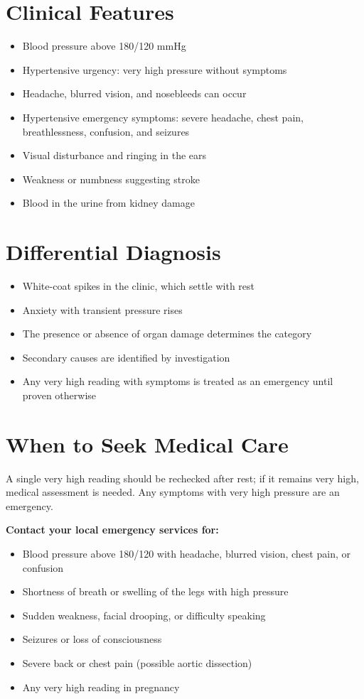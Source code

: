 \section*{Clinical Features}
\begin{itemize}
    \item Blood pressure above 180/120 mmHg
    \item Hypertensive urgency: very high pressure without symptoms
    \item Headache, blurred vision, and nosebleeds can occur
    \item Hypertensive emergency symptoms: severe headache, chest pain, breathlessness, confusion, and seizures
    \item Visual disturbance and ringing in the ears
    \item Weakness or numbness suggesting stroke
    \item Blood in the urine from kidney damage
\end{itemize}

\section*{Differential Diagnosis}
\begin{itemize}
    \item White-coat spikes in the clinic, which settle with rest
    \item Anxiety with transient pressure rises
    \item The presence or absence of organ damage determines the category
    \item Secondary causes are identified by investigation
    \item Any very high reading with symptoms is treated as an emergency until proven otherwise
\end{itemize}

\section*{When to Seek Medical Care}
A single very high reading should be rechecked after rest; if it remains very high, medical assessment is needed. Any symptoms with very high pressure are an emergency.

\textbf{Contact your local emergency services for:}
\begin{itemize}
    \item Blood pressure above 180/120 with headache, blurred vision, chest pain, or confusion
    \item Shortness of breath or swelling of the legs with high pressure
    \item Sudden weakness, facial drooping, or difficulty speaking
    \item Seizures or loss of consciousness
    \item Severe back or chest pain (possible aortic dissection)
    \item Any very high reading in pregnancy
\end{itemize}

